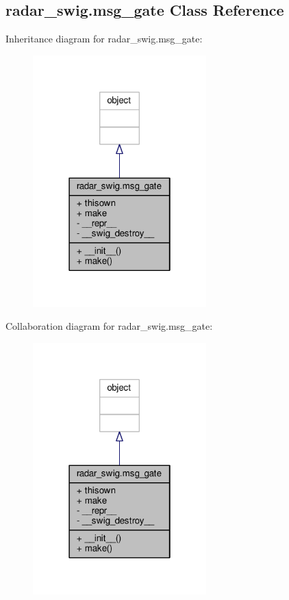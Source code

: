 \subsection{radar\+\_\+swig.\+msg\+\_\+gate Class Reference}
\label{classradar__swig_1_1msg__gate}


Inheritance diagram for radar\+\_\+swig.\+msg\+\_\+gate\+:
\nopagebreak
\begin{figure}[H]
\begin{center}
\leavevmode
\includegraphics[width=190pt]{d0/d7e/classradar__swig_1_1msg__gate__inherit__graph}
\end{center}
\end{figure}


Collaboration diagram for radar\+\_\+swig.\+msg\+\_\+gate\+:
\nopagebreak
\begin{figure}[H]
\begin{center}
\leavevmode
\includegraphics[width=190pt]{d5/d17/classradar__swig_1_1msg__gate__coll__graph}
\end{center}
\end{figure}
